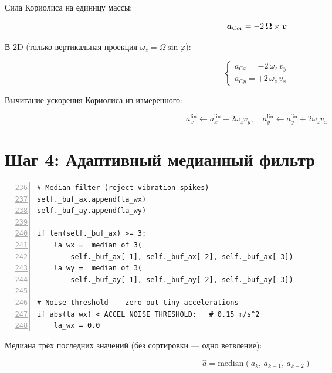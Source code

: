 Сила Кориолиса на единицу массы:

\begin{equation}
  \bm{a}_{\text{Cor}} = -2\,\bm{\Omega} \times \bm{v}
  \label{eq:coriolis}
\end{equation}

В 2D (только вертикальная проекция $\omega_z = \Omega\sin\varphi$):

\begin{equation}
  \begin{cases}
    a_{Cx} = -2\,\omega_z\,v_y \\
    a_{Cy} = +2\,\omega_z\,v_x
  \end{cases}
  \label{eq:coriolis_2d}
\end{equation}

Вычитание ускорения Кориолиса из измеренного:

\begin{equation}
  a^{\text{lin}}_x \leftarrow a^{\text{lin}}_x - 2\omega_z v_y, \quad
  a^{\text{lin}}_y \leftarrow a^{\text{lin}}_y + 2\omega_z v_x
  \label{eq:coriolis_remove}
\end{equation}

\section{Шаг 4: Адаптивный медианный фильтр}

\begin{filebox}[title={\filepath{accel\_position.py}, строки 236--250}]
\begin{lstlisting}[style=pythonstyle, numbers=left, firstnumber=236]
# Median filter (reject vibration spikes)
self._buf_ax.append(la_wx)
self._buf_ay.append(la_wy)

if len(self._buf_ax) >= 3:
    la_wx = _median_of_3(
        self._buf_ax[-1], self._buf_ax[-2], self._buf_ax[-3])
    la_wy = _median_of_3(
        self._buf_ay[-1], self._buf_ay[-2], self._buf_ay[-3])

# Noise threshold -- zero out tiny accelerations
if abs(la_wx) < ACCEL_NOISE_THRESHOLD:   # 0.15 m/s^2
    la_wx = 0.0
\end{lstlisting}
\end{filebox}

Медиана трёх последних значений (без сортировки --- одно ветвление):

\begin{equation}
  \hat{a} = \mathrm{median}(a_{k},\, a_{k-1},\, a_{k-2})
  \label{eq:median3}
\end{equation}

